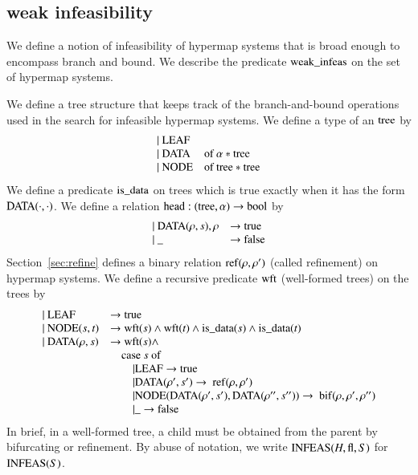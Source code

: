 \subsection{weak infeasibility}
\label{sec:weak}

We define a notion of infeasibility of  hypermap systems that is
broad enough to encompass branch and bound.  We describe the
predicate ${\operatorname{weak\_infeas}}$ on the set of hypermap systems.

We define a tree structure that keeps track of the
branch-and-bound operations used in the search for infeasible
hypermap systems.  We define a type of an ${\operatorname{tree}}$ by
    $$
    \begin{array}{lll}
    |\ {\operatorname{LEAF}}&\\
    |\ {\operatorname{DATA}} &\text{of } \alpha * {\operatorname{tree}}\\
    |\ {\operatorname{NODE}} &\text{of } {\operatorname{tree}} * {\operatorname{tree}}\\
    \end{array}
    $$
%
We define a predicate ${\operatorname{is\_data}}$ on trees which is true
exactly when it has the form ${\operatorname{DATA}}(\cdot,\cdot)$. We define a
relation ${\operatorname{head}}:({\operatorname{tree}},\alpha)\to \operatorname{bool}$ by
    $$
    \begin{array}{lll}
    |\ {\operatorname{DATA}}(\rho,s),\rho &\to {\operatorname{true}}\\
    |\  {\operatorname{\_}} &\to {\operatorname{false}}
    \end{array}
    $$
Section~\ref{sec:refine} defines a binary relation
${\operatorname{ref}}(\rho,\rho')$ (called refinement) on hypermap systems. We
define a recursive predicate ${\operatorname{wft}}$ (well-formed trees) on the
trees by
    $$
    \begin{array}{lll}
    |\ {\operatorname{LEAF}} &\to{\operatorname{true}}\\
    |\ {\operatorname{NODE}}(s,t) &\to {\operatorname{wft}}(s) \wedge {\operatorname{wft}}(t)
    \wedge {\operatorname{is\_data}}(s) \wedge {\operatorname{is\_data}}(t)\\
    |\ {\operatorname{DATA}}(\rho,s) &\to {\operatorname{wft}}(s) \wedge\\
        &\quad \text{case}\ s\ \text{of}\\
        &\qquad|{\operatorname{LEAF}}\to{\operatorname{true}}\\
        &\qquad|{\operatorname{DATA}}(\rho',s')\to \ {\operatorname{ref}}(\rho,\rho')\\
        &\qquad|{\operatorname{NODE}}({\operatorname{DATA}}(\rho',s'),{\operatorname{DATA}}(\rho'',s''))\to
        \ {\operatorname{bif}}(\rho,\rho',\rho'')\\
        &\qquad|{\operatorname{\_}} \to {\operatorname{false}}\\
    \end{array}
    $$
In brief, in a well-formed tree, a child must be obtained from the
parent by bifurcating or refinement.
%
By abuse of notation, we write ${\operatorname{INFEAS}}(H,{\operatorname{fl}},S)$ for
${\operatorname{INFEAS}}(S)$.

